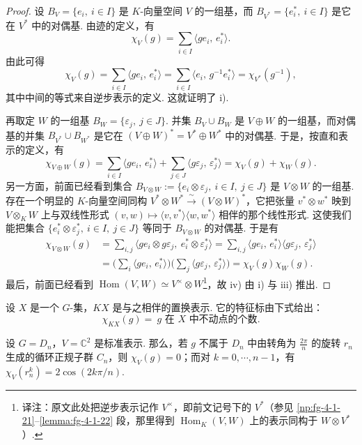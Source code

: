 \begin{proof}
设 $B_V=\{e_i,\ i\in I\}$ 是 $K$-向量空间 $V$ 的一组基，而 $B_{V^*}=\{e_i^*,\ i\in I\}$ 是它在 $V^*$ 中的对偶基. 由迹的定义，有
\[
\chi_V(g)=\sum_{i\in I}\langle ge_i,\,e_i^*\rangle.
\]
由此可得
\[
\chi_V(g)=\sum_{i\in I}\langle ge_i,\,e_i^*\rangle=\sum_{i\in I}\langle e_i,\,g^{-1}e_i^*\rangle=\chi_{V^*}(g^{-1}),
\]
其中中间的等式来自逆步表示的定义. 这就证明了 i).

再取定 $W$ 的一组基 $B_W=\{\varepsilon_j,\ j\in J\}$. 并集 $B_V\cup B_W$ 是 $V\oplus W$ 的一组基，而对偶基的并集 $B_{V^*}\cup B_{W^*}$ 是它在 $(V\oplus W)^*=V^*\oplus W^*$ 中的对偶基. 于是，按直和表示的定义，有
\[
\chi_{V\oplus W}(g)=\sum_{i\in I}\langle ge_i,\,e_i^*\rangle+\sum_{j\in J}\langle g\varepsilon_j,\,\varepsilon_j^*\rangle=\chi_V(g)+\chi_W(g).
\]
另一方面，前面已经看到集合 $B_{V\otimes W}:=\{e_i\otimes\varepsilon_j,\ i\in I,\ j\in J\}$ 是 $V\otimes W$ 的一组基. 存在一个明显的 $K$-向量空间同构 $V^*\otimes W^*\xrightarrow{\ \sim\ }(V\otimes W)^*$，它把张量 $v^*\otimes w^*$ 映到 $V\otimes_K W$ 上与双线性形式 $(v,w)\mapsto\langle v,v^*\rangle\langle w,w^*\rangle$ 相伴的那个线性形式. 这使我们能把集合 $\{e_i^*\otimes\varepsilon_j^*,\ i\in I,\ j\in J\}$ 等同于 $B_{V\otimes W}$ 的对偶基. 于是有
\[
\begin{aligned}
\chi_{V\otimes W}(g) &= \sum_{i,j}\langle ge_i\otimes g\varepsilon_j,\ e_i^*\otimes\varepsilon_j^*\rangle=\sum_{i,j}\langle ge_i,\,e_i^*\rangle\langle g\varepsilon_j,\,\varepsilon_j^*\rangle\\
&=\Biggl(\sum_i\langle ge_i,\,e_i^*\rangle\Biggr)\Biggl(\sum_j\langle g\varepsilon_j,\,\varepsilon_j^*\rangle\Biggr)=\chi_V(g)\chi_W(g).
\end{aligned}
\]
最后，前面已经看到 $\operatorname{Hom}(V,W)\simeq V^\times\otimes W$\footnote{译注：原文此处把逆步表示记作 $V^\times$，即前文记号下的 $V^*$（参见 \ref{np:fg-4-1-21}--\ref{lemma:fg-4-1-22} 段，那里得到 $\operatorname{Hom}_K(V,W)$ 上的表示同构于 $W\otimes V^*$）.}，故 iv) 由 i) 与 iii) 推出.
\end{proof}

\begin{example}\label{ex:fg-4-2-4}
设 $X$ 是一个 $G$-集，$KX$ 是与之相伴的置换表示. 它的特征标由下式给出：
\[
\chi_{KX}(g)=\ \text{$g$ 在 $X$ 中不动点的个数}.
\]
\end{example}

\begin{example}\label{ex:fg-4-2-5}
设 $G=D_n$，$V=\mathbb{C}^2$ 是标准表示. 那么，若 $g$ 不属于 $D_n$ 中由转角为 $\frac{2\pi}{n}$ 的旋转 $r_n$ 生成的循环正规子群 $C_n$，则 $\chi_V(g)=0$；而对 $k=0,\cdots,n-1$，有 $\chi_V(r_n^k)=2\cos(2k\pi/n)$.
\end{example}

